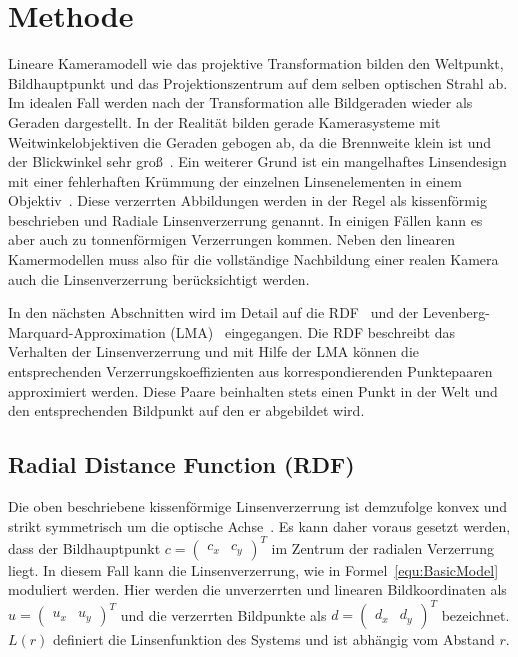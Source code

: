 \section{Methode}
Lineare Kameramodell wie das projektive Transformation bilden den Weltpunkt, Bildhauptpunkt und das Projektionszentrum auf dem selben optischen Strahl ab. Im idealen Fall werden nach der Transformation alle Bildgeraden wieder als Geraden dargestellt. In der Realität bilden gerade Kamerasysteme mit Weitwinkelobjektiven die Geraden gebogen ab, da die Brennweite klein ist und der Blickwinkel sehr groß~\cite{HartleyRadDist}. Ein weiterer Grund ist ein mangelhaftes Linsendesign mit einer fehlerhaften Krümmung der einzelnen Linsenelementen in einem Objektiv~\cite{WengRadDist}\cite{Zhang:1996:EGT:844381.845228}. Diese verzerrten Abbildungen werden in der Regel als kissenförmig beschrieben und Radiale Linsenverzerrung genannt. In einigen Fällen kann es aber auch zu tonnenförmigen Verzerrungen kommen. Neben den linearen Kamermodellen muss also für die vollständige Nachbildung einer realen Kamera auch die Linsenverzerrung berücksichtigt werden. 

In den nächsten Abschnitten wird im Detail auf die RDF~\cite{HartleyRadDist} und der Levenberg-Marquard-Approximation (LMA)~\cite{LevMarquardt} eingegangen. Die RDF beschreibt das Verhalten der Linsenverzerrung und mit Hilfe der LMA können die entsprechenden Verzerrungskoeffizienten aus korrespondierenden Punktepaaren  approximiert werden. Diese Paare beinhalten stets einen Punkt in der Welt und den entsprechenden Bildpunkt auf den er abgebildet wird.

\subsection{Radial Distance Function (RDF)}
\label{sec:RDF}
Die oben beschriebene kissenförmige Linsenverzerrung ist demzufolge konvex und strikt symmetrisch um die optische Achse~\cite{WengRadDist}. Es kann daher voraus gesetzt werden, dass der Bildhauptpunkt $c= \begin{pmatrix}
c_x & c_y
\end{pmatrix}^T$ im Zentrum der radialen Verzerrung liegt. In diesem Fall kann die Linsenverzerrung, wie in Formel~\ref{equ:BasicModel} moduliert werden. Hier werden die unverzerrten und linearen Bildkoordinaten als $u= \begin{pmatrix}
u_x & u_y
\end{pmatrix}^T$ und die verzerrten Bildpunkte als $d= \begin{pmatrix}
d_x & d_y
\end{pmatrix}^T$ bezeichnet. $L(r)$ definiert die Linsenfunktion des Systems und ist abhängig vom Abstand $r$.

